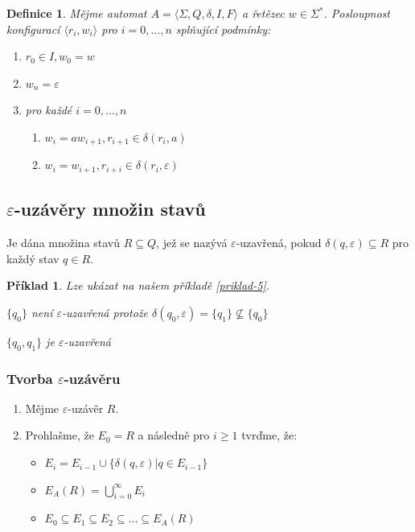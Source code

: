 \documentclass[10pt, a4paper, titlepage]{article}
\theoremstyle{note}
\newtheorem{definice}{Definice}
\newtheorem{priklad}{Příklad}
\begin{document}
\begin{definice}
Mějme automat $A = \langle \Sigma,Q,\delta,I,F \rangle$ a řetězec $w \in \Sigma^*$. Posloupnost konfigurací $\langle r_i,w_i \rangle$ pro $i=0,\ldots,n$ splňující podmínky:
\begin{enumerate}
\item
$r_{0} \in I, w_0=w$
\item
$w_{n} = \varepsilon$
\item
pro každé $i=0,\ldots,n$
\begin{enumerate}
\item
$w_i = aw_{i+1}, r_{i+1} \in \delta(r_i,a)$
\item
$w_i=w_{i+1} , r_{i+i} \in \delta(r_i,\varepsilon)$
\end{enumerate}
\end{enumerate}

\end{definice}

\subsection{$\varepsilon$-uzávěry množin stavů}

Je dána množina stavů $R \subseteq Q$, jež se nazývá $\varepsilon$-uzavřená,
pokud $ \delta (q,\varepsilon) \subseteq R$ pro každý stav $ q \in R$.

\begin{priklad}
Lze ukázat na našem příkladě \ref{priklad-5}.

$\lbrace q_0 \rbrace $ není $\varepsilon$-uzavřená protože $\delta(q_0,\varepsilon) = \lbrace q_1 \rbrace \nsubseteq \lbrace q_0 \rbrace$

$\lbrace q_0,q_1 \rbrace$ je $\varepsilon$-uzavřená
\end{priklad}

\subsubsection{Tvorba $\varepsilon$-uzávěru}

\begin{enumerate}
\item
Mějme $\varepsilon$-uzávěr $R$.

\item
Prohlašme, že $E_0=R$ a následně pro $i \geq 1$ tvrďme, že:

\begin{itemize}
\item
$E_i=E_{i-1} \cup \lbrace \delta (q,\varepsilon) | q \in E_{i-1}\rbrace$

\item
$E_A(R)=\bigcup_{i=0}^\infty E_i$

\item
$E_0 \subseteq E_1 \subseteq E_2 \subseteq \ldots \subseteq E_A(R)$
\end{itemize}
\end{enumerate}
\end{document}
